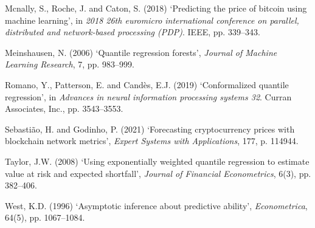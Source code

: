 \documentclass[
  a4paper,
  DIV=11,
  numbers=noendperiod]{scrreprt}
\newlength{\cslhangindent}
\newenvironment{CSLReferences}[2] %
 {\begin{list}{}{%
  \setlength{\itemindent}{0pt}
  \setlength{\leftmargin}{0pt}
  \setlength{\parsep}{0pt}
  \ifodd #1
   \setlength{\leftmargin}{\cslhangindent}
   \setlength{\itemindent}{-1\cslhangindent}
  \fi
  \setlength{\itemsep}{#2\baselineskip}}}
 {\end{list}}
\begin{document}
\begin{CSLReferences}{0}{1}
Mcnally, S., Roche, J. and Caton, S. (2018) {`Predicting the price of
bitcoin using machine learning'}, in \emph{2018 26th euromicro
international conference on parallel, distributed and network-based
processing (PDP)}. IEEE, pp. 339--343.

Meinshausen, N. (2006) {`Quantile regression forests'}, \emph{Journal of
Machine Learning Research}, 7, pp. 983--999.

Romano, Y., Patterson, E. and Candès, E.J. (2019) {`Conformalized
quantile regression'}, in \emph{Advances in neural information
processing systems 32}. Curran Associates, Inc., pp. 3543--3553.

Sebastião, H. and Godinho, P. (2021) {`Forecasting cryptocurrency prices
with blockchain network metrics'}, \emph{Expert Systems with
Applications}, 177, p. 114944.

Taylor, J.W. (2008) {`Using exponentially weighted quantile regression
to estimate value at risk and expected shortfall'}, \emph{Journal of
Financial Econometrics}, 6(3), pp. 382--406.

West, K.D. (1996) {`Asymptotic inference about predictive ability'},
\emph{Econometrica}, 64(5), pp. 1067--1084.

\end{CSLReferences}
\end{document}
